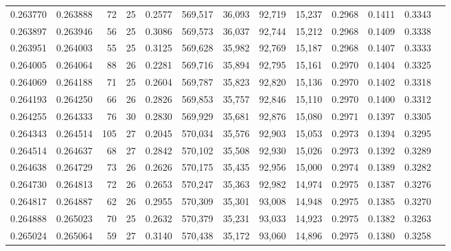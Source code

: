 \begin{tabular}{rrrrrrrrrrrrr}
0.263770 & 0.263888 &  72 &  25 &                                     0.2577 & 569,517 &  36,093 &  92,719 &  15,237 & 0.2968 & 0.1411 & 0.3343 \\
0.263897 & 0.263946 &  56 &  25 &                                     0.3086 & 569,573 &  36,037 &  92,744 &  15,212 & 0.2968 & 0.1409 & 0.3338 \\
0.263951 & 0.264003 &  55 &  25 &                                     0.3125 & 569,628 &  35,982 &  92,769 &  15,187 & 0.2968 & 0.1407 & 0.3333 \\
0.264005 & 0.264064 &  88 &  26 &                                     0.2281 & 569,716 &  35,894 &  92,795 &  15,161 & 0.2970 & 0.1404 & 0.3325 \\
0.264069 & 0.264188 &  71 &  25 &                                     0.2604 & 569,787 &  35,823 &  92,820 &  15,136 & 0.2970 & 0.1402 & 0.3318 \\
0.264193 & 0.264250 &  66 &  26 &                                     0.2826 & 569,853 &  35,757 &  92,846 &  15,110 & 0.2970 & 0.1400 & 0.3312 \\
0.264255 & 0.264333 &  76 &  30 &                                     0.2830 & 569,929 &  35,681 &  92,876 &  15,080 & 0.2971 & 0.1397 & 0.3305 \\
0.264343 & 0.264514 & 105 &  27 &                                     0.2045 & 570,034 &  35,576 &  92,903 &  15,053 & 0.2973 & 0.1394 & 0.3295 \\
0.264514 & 0.264637 &  68 &  27 &                                     0.2842 & 570,102 &  35,508 &  92,930 &  15,026 & 0.2973 & 0.1392 & 0.3289 \\
0.264638 & 0.264729 &  73 &  26 &                                     0.2626 & 570,175 &  35,435 &  92,956 &  15,000 & 0.2974 & 0.1389 & 0.3282 \\
0.264730 & 0.264813 &  72 &  26 &                                     0.2653 & 570,247 &  35,363 &  92,982 &  14,974 & 0.2975 & 0.1387 & 0.3276 \\
0.264817 & 0.264887 &  62 &  26 &                                     0.2955 & 570,309 &  35,301 &  93,008 &  14,948 & 0.2975 & 0.1385 & 0.3270 \\
0.264888 & 0.265023 &  70 &  25 &                                     0.2632 & 570,379 &  35,231 &  93,033 &  14,923 & 0.2975 & 0.1382 & 0.3263 \\
0.265024 & 0.265064 &  59 &  27 &                                     0.3140 & 570,438 &  35,172 &  93,060 &  14,896 & 0.2975 & 0.1380 & 0.3258 \\

\end{tabular}
